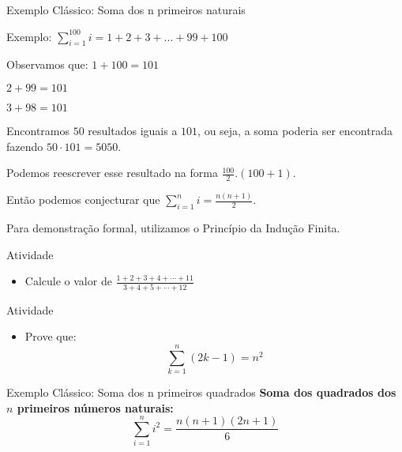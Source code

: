 \documentclass{beamer} %
\begin{document}
\begin{frame}{Exemplo Clássico: Soma dos n primeiros naturais}

Exemplo: $\displaystyle \sum_{i=1}^{100} i = 1+2+3+...+99+100$
    
Observamos que: \hspace{1cm} $1 + 100 = 101$

\hspace{4cm}  $2 + 99 = 101$
    
\hspace{4cm} $3 + 98 = 101$

\vspace{0.2cm}

Encontramos $50$ resultados iguais a $101$, ou seja, a soma poderia ser encontrada fazendo $50 \cdot 101 = 5050.$

\vspace{0.2cm}

Podemos reescrever esse resultado na forma $\displaystyle \frac{100}{2} .(100+1).$

\vspace{0.2cm}

Então podemos conjecturar que $\displaystyle \sum_{i=1}^{n} i = \frac{n(n+1)}{2}.$

\vspace{0.2cm}

Para demonstração formal, utilizamos o Princípio da Indução Finita.

\end{frame}

\begin{frame}{Atividade}

\begin{itemize}
\item  Calcule o valor de $\displaystyle \frac{1+2+3+4+\cdots + 11}{3+4+5+\cdots + 12}$
\end{itemize}
\end{frame}

\begin{frame}{Atividade}

\begin{itemize}
		\item Prove que:
		\[
		\sum_{k=1}^{n} (2k-1) = n^2
		\]
\end{itemize}
    
\end{frame}


\begin{frame}{Exemplo Clássico: Soma dos n primeiros quadrados}
    \textbf{Soma dos quadrados dos \( n \) primeiros números naturais:}
    \[
    \displaystyle \sum_{i=1}^{n} i^2 = \frac{n(n+1)(2n+1)}{6}
    \]
\end{frame}
\end{document}
